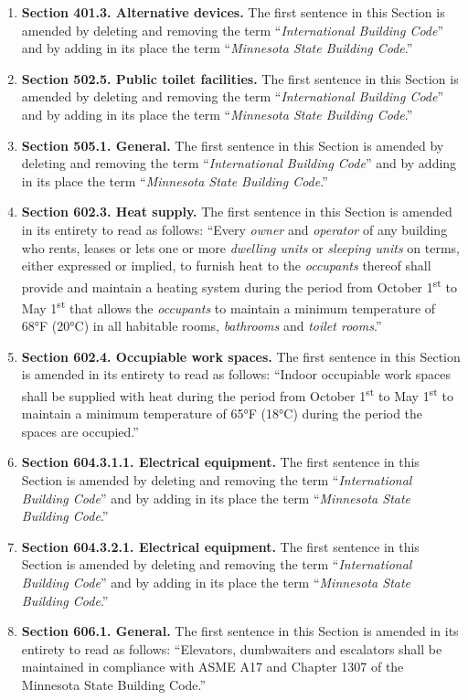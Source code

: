 \begin{enumerate}[{\indent}1)]
    \item \textbf{Section 401.3. Alternative devices.} The first sentence in this Section is amended by deleting and removing the term “\textit{International Building Code}” and by adding in its place the term “\textit{Minnesota State Building Code}.”
    \item \textbf{Section 502.5. Public toilet facilities.} The first sentence in this Section is amended by deleting and removing the term “\textit{International Building Code}” and by adding in its place the term “\textit{Minnesota State Building Code}.”
    \item \textbf{Section 505.1. General.} The first sentence in this Section is amended by deleting and removing the term “\textit{International Building Code}” and by adding in its place the term “\textit{Minnesota State Building Code}.”
    \item \textbf{Section 602.3. Heat supply.} The first sentence in this Section is amended in its entirety to read as follows: “Every \textit{owner} and \textit{operator} of any building who rents, leases or lets one or more \textit{dwelling units} or \textit{sleeping units} on terms, either expressed or implied, to furnish heat to the \textit{occupants} thereof shall provide and maintain a heating system during the period from October 1\textsuperscript{st} to May 1\textsuperscript{st} that allows the \textit{occupants} to maintain a minimum temperature of 68°F (20°C) in all habitable rooms, \textit{bathrooms} and \textit{toilet rooms}.”
    \item \textbf{Section 602.4. Occupiable work spaces.} The first sentence in this Section is amended in its entirety to read as follows: “Indoor occupiable work spaces shall be supplied with heat during the period from October 1\textsuperscript{st} to May 1\textsuperscript{st} to maintain a minimum temperature of 65°F (18°C) during the period the spaces are occupied.”
    \item \textbf{Section 604.3.1.1. Electrical equipment.} The first sentence in this Section is amended by deleting and removing the term “\textit{International Building Code}” and by adding in its place the term “\textit{Minnesota State Building Code}.”
    \item \textbf{Section 604.3.2.1. Electrical equipment.} The first sentence in this Section is amended by deleting and removing the term “\textit{International Building Code}” and by adding in its place the term “\textit{Minnesota State Building Code}.”
    \item \textbf{Section 606.1. General.} The first sentence in this Section is amended in its entirety to read as follows: “Elevators, dumbwaiters and escalators shall be maintained in compliance with ASME A17 and Chapter 1307 of the Minnesota State Building Code.”

\end{enumerate}
